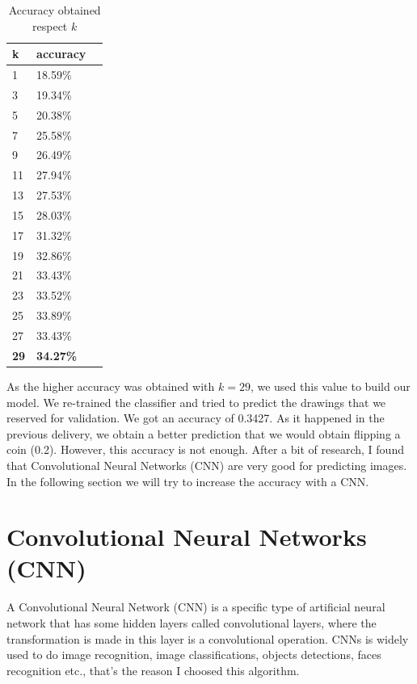 \documentclass{article}
\begin{document}
\begin{table}[H]
    \centering
    \begin{tabular}{|l|l|l|}
        \hline
        \textbf{k} & \textbf{accuracy}  \\
        \hline
        1 & 18.59\% \\
        \hline
        3 & 19.34\% \\
        \hline
        5 & 20.38\% \\
        \hline
        7 & 25.58\% \\
        \hline
        9 & 26.49\% \\
        \hline
        11 & 27.94\% \\
        \hline
        13 & 27.53\% \\
        \hline
        15 & 28.03\% \\
        \hline
        17 & 31.32\% \\
        \hline
        19 & 32.86\% \\
        \hline
        21 & 33.43\% \\
        \hline
        23 & 33.52\% \\
        \hline
        25 & 33.89\% \\
        \hline
        27 & 33.43\% \\
        \hline
        \textbf{29} & \textbf{34.27\%} \\
        \hline
    \end{tabular}
    \caption{Accuracy obtained respect $k$}
    \label{tab:knn_results}
\end{table}

As the higher accuracy was obtained with $k=29$, we used this value to build our model. We re-trained the classifier and tried to predict the drawings that we reserved for validation. We got an accuracy of 0.3427. As it happened in the previous delivery, we obtain a better prediction that we would obtain flipping a coin (0.2). However, this accuracy is not enough. After a bit of research, I found that Convolutional Neural Networks (CNN) are very good for predicting images. In the following section we will try to increase the accuracy with a CNN.

\section{Convolutional Neural Networks (CNN)}
\label{CNN}

A Convolutional Neural Network (CNN) is a specific type of artificial neural network that has some hidden layers called convolutional layers, where the transformation is made in this layer is a convolutional operation. CNNs is widely used to do image recognition, image classifications, objects detections, faces recognition etc., that's the reason I choosed this algorithm.
\end{document}
